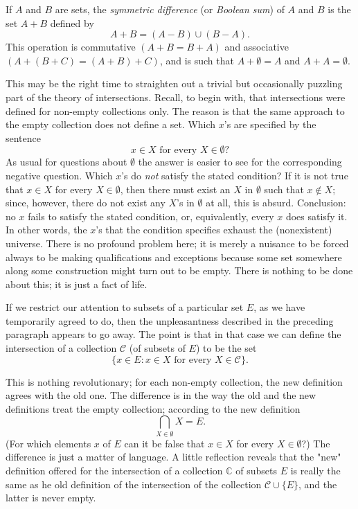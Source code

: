 If $A$ and $B$ are sets, the \textit{symmetric difference} (or \textit{Boolean sum}) of $A$ and $B$ is the set $A + B$ defined by
\[
	A + B = (A - B) \cup (B - A).
\]
This operation is commutative $(A + B = B + A)$ and associative $(A + (B + C) = (A + B) + C)$, and is such that $A + \emptyset = A$ and $A + A = \emptyset$.

This may be the right time to straighten out a trivial but occasionally puzzling part of the theory of intersections. Recall, to begin with, that intersections were defined for non-empty collections only. The reason is that the same approach to the empty collection does not define a set. Which $x$'s are specified by the sentence
\[
	x \in X \text{ for every } X \in \emptyset?
\]
As usual for questions about $\emptyset$ the answer is easier to see for the corresponding negative question. Which $x$'s do \textit{not} satisfy the stated condition? If it is not true that $x \in X$ for every $X \in \emptyset$, then there must exist an $X$ in $\emptyset$ such that $x \not \in X$; since, however, there do not exist any $X$'s in $\emptyset$ at all, this is absurd. Conclusion: no $x$ fails to satisfy the stated condition, or, equivalently, every $x$ does satisfy it. In other words, the $x$'s that the condition specifies exhaust the (nonexistent) universe. There is no profound problem here; it is merely a nuisance to be forced always to be making qualifications and exceptions because some set somewhere along some construction might turn out to be empty. There is nothing to be done about this; it is just a fact of life.

If we restrict our attention to subsets of a particular set $E$, as we have temporarily agreed to do, then the unpleasantness described in the preceding paragraph appears to go away. The point is that in that case we can define the intersection of a collection $\mathcal{C}$ (of subsets of $E$) to be the set
\[
	\{ x \in E : x \in X \text{ for every } X \in \mathcal{C}\}.
\]

This is nothing revolutionary; for each non-empty collection, the new definition agrees with the old one. The difference is in the way the old and the new definitions treat the empty collection; according to the new definition
\[
	\bigcap_{X \in \emptyset} X = E.
\]
(For which elements $x$ of $E$ can it be false that $x \in X$ for every $X \in \emptyset$?) The difference  is just a matter of language. A little reflection reveals that the "new" definition offered for the intersection of a collection $\mathbb{C}$ of subsets $E$ is really the same as he old definition of the intersection of the collection $\mathcal{C} \cup \{E\}$, and the latter is never empty.

